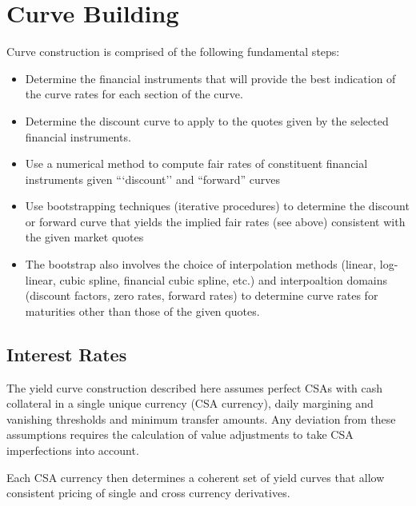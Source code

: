 \section{Curve Building}
\label{sec:curves}

Curve construction is comprised of the following fundamental steps:
\begin{itemize}
\item Determine the financial instruments that will provide the best indication 
of the curve rates for each section of the curve.
\item Determine the discount curve to apply to the quotes given by the selected 
financial instruments.
\item Use a numerical method to compute fair rates of constituent
  financial instruments given ```discount'' and ``forward'' curves
\item Use bootstrapping techniques (iterative procedures) to determine
  the discount or forward curve that yields the implied fair rates
  (see above) consistent with the given market quotes
\item The bootstrap also involves the choice of interpolation methods
  (linear, log-linear, cubic spline, financial cubic spline, etc.) and
  interpoaltion domains (discount factors, zero rates, forward rates)
  to determine curve rates for maturities other  than those of the given quotes.
\end{itemize}

\subsection{Interest Rates}

The yield curve construction described here assumes perfect CSAs with cash collateral
in a single unique currency (CSA currency), daily margining and vanishing 
thresholds and minimum transfer amounts. Any deviation from these assumptions
requires the calculation of value adjustments to take CSA imperfections into account.

\medskip
Each CSA currency then determines a coherent set of yield curves that allow consistent 
pricing of single and cross currency derivatives.

